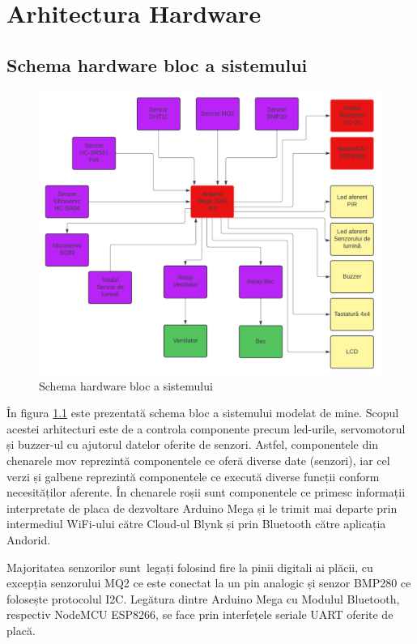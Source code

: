 \chapter{Arhitectura Hardware}
\thispagestyle{pagestyle}
\section{Schema hardware bloc a sistemului}

\begin{figure}[h]
\includegraphics[width=1\textwidth]{bachelors_ro/images/schema_bloc.png}
\caption{Schema hardware bloc a sistemului}
\label{fig:schema_bloc}
\end{figure}

În figura \ref{fig:schema_bloc} este prezentată schema bloc a sistemului modelat de mine. Scopul acestei arhitecturi este de a controla componente precum led-urile, servomotorul și buzzer-ul cu ajutorul datelor oferite de senzori. Astfel, componentele din chenarele mov reprezintă componentele ce oferă diverse date (senzori), iar cel verzi și galbene reprezintă componentele ce execută diverse funcții conform necesităților aferente. În chenarele roșii sunt componentele ce primesc informații interpretate de placa de dezvoltare Arduino Mega și le trimit mai departe prin intermediul WiFi-ului către Cloud-ul Blynk și prin Bluetooth către aplicația Andorid.

Majoritatea senzorilor sunt legați folosind fire la pinii digitali ai plăcii, cu excepția senzorului MQ2 ce este conectat la un pin analogic și senzor BMP280 ce folosește protocolul I2C. Legătura dintre Arduino Mega cu Modulul Bluetooth, respectiv NodeMCU ESP8266, se face prin interfețele seriale UART oferite de placă.

